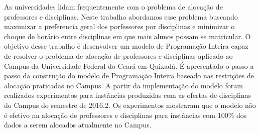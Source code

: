 As universidades lidam frequentemente com o problema de alocação de professores e disciplinas. Neste trabalho abordamos esse problema buscando maximizar a preferencia geral dos porfessores por disciplinas e minimizar o choque de horário entre disciplinas em que mais alunos possam se matricular. O objetivo desse trabalho é desenvolver um modelo de Programação Inteira capaz de resolver o problema de alocação de professores e disciplinas aplicado ao Campus da Universidade Federal do Ceará em Quixadá. É apresentado o passo a passo da construção do modelo de Programação Inteira baseado nas restrições de alocação praticadas no Campus. A partir da implementação do modelo foram realizados experimentos para instâncias produzidas com as ofertas de disciplinas do Campus do semestre de 2016.2. Os experimentos mostraram que o modelo não é efetivo na alocação de professores e disciplinas para instâncias com 100\% dos dados a serem alocados atualmente no Campus.



